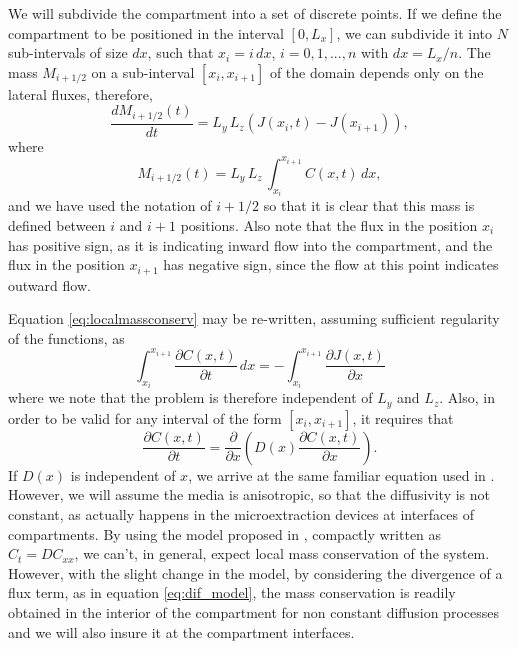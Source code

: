 \documentclass[final,1p,times]{elsarticle}
\begin{document}
We will subdivide the compartment into a set of discrete points. If we define the compartment to be positioned in the interval $[0, L_x]$, we can subdivide it into $N$ sub-intervals of size $dx$, such that $x_i=i\,dx$, $i=0, 1, ..., n$ with $dx=L_x/n$. The mass $M_{i+1/2}$ on a sub-interval $[x_i, x_{i+1}]$ of the domain depends only on the lateral fluxes, therefore,
\begin{equation}
\frac{d M_{i+1/2}(t)}{dt}= L_y\, L_z (J(x_{i}, t)-J(x_{i+1})),
\label{eq:localmassconserv}
\end{equation}
where
\begin{equation}
M_{i+1/2}(t)=L_y\, L_z\,\int_{x_i}^{x_{i+1}}C(x,t) \,dx,
\end{equation}
and we have used the notation of $i+1/2$ so that it is clear that this mass is defined between $i$ and $i+1$ positions. Also note that the flux in the position $x_i$ has positive sign, as it is indicating inward flow into the compartment, and the flux in the position $x_{i+1}$ has negative sign, since the flow at this point indicates outward flow.


Equation \ref{eq:localmassconserv} may be re-written, assuming sufficient regularity of the functions, as
\begin{equation}
\int_{x_i}^{x_{i+1}} \frac{\partial C(x,t) }{\partial t}  \,dx =  -\int_{x_i}^{x_{i+1}}\frac{\partial J(x,t)}{\partial x} 
\end{equation}
where we note that the problem is therefore independent of $L_y$ and $L_z$. Also,  in order to be valid for any interval of the form $[x_i, x_{i+1}]$, it requires that
\begin{equation}
\frac{\partial C(x,t) }{\partial t}=\frac{\partial  }{\partial x}
\left(D(x) \frac{\partial C(x,t)}{\partial x}\right).
\label{eq:dif_model}
\end{equation}
If $D(x)$ is independent of $x$, we arrive at the same familiar equation used in \citet{zhang1993headspace}. However, we will assume the media is anisotropic, so that the diffusivity is not constant, as actually happens in the microextraction devices at interfaces of compartments. By using the model proposed in \citet{zhang1993headspace}, compactly written as $C_t=DC_{xx}$, we can't, in general, expect local mass conservation of the system. However, with the slight change in the model, by considering the divergence of a flux term, as in equation \eqref{eq:dif_model}, the mass conservation is readily obtained in the interior of the compartment for non constant diffusion processes and we will also insure it at the compartment interfaces.
\end{document}
